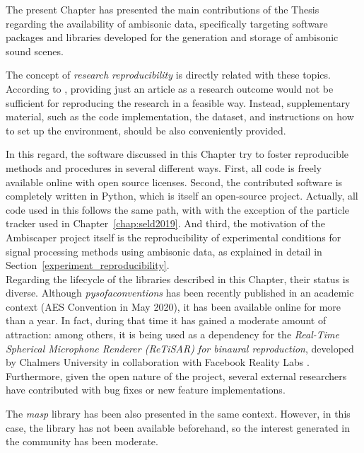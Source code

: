 The present Chapter has presented the main contributions of the Thesis regarding the availability of ambisonic data, specifically targeting software packages and libraries developed for the generation and storage of ambisonic sound scenes.

The concept of \textit{research reproducibility} is directly related with these topics. According to \cite{cannam2012sound}, providing just an article as a research outcome would not be sufficient for reproducing the research in a feasible way. Instead, supplementary material, such as the code implementation, the dataset, and instructions on how to set up the environment, should be also conveniently provided. 

In this regard, the software discussed in this Chapter try to foster reproducible methods and procedures in several different ways.
First, all code is freely available online with open source licenses. 
Second, the contributed software is completely written in Python, which is itself an open-source project. Actually, all code used in this follows the same path, with with the exception of the particle tracker used in Chapter~\ref{chap:seld2019}. 
And third, the motivation of the Ambiscaper project itself is the reproducibility of experimental conditions for signal processing methods using ambisonic data, as explained in detail in Section~\ref{experiment_reproducibility}.\\

Regarding the lifecycle of the libraries described in this Chapter, their status is diverse. Although \textit{pysofaconventions} has been recently published in an academic context (AES Convention in May 2020), it has been available online for more than a year. In fact, during that time it has gained a moderate amount of attraction: among others, it is being used as a dependency for the \textit{Real-Time Spherical Microphone Renderer (ReTiSAR) for binaural reproduction}, developed by Chalmers University in collaboration with Facebook Reality Labs \cite{helmholz2019real}. Furthermore, given the open nature of the project, several external researchers have contributed with bug fixes or new feature implementations.

The \textit{masp} library has been also presented in the same context. However, in this case, the library has not been available beforehand, so the interest generated in the community has been moderate. 

